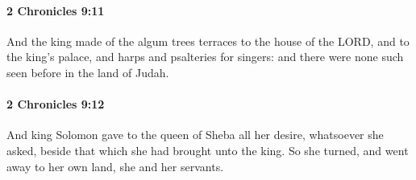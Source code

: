 		\paragraph{2 Chronicles 9:11} %
			\label{2CHRONICLES-9-11}

			And the king made of the algum trees terraces to the house of the LORD, and to the king's palace, and harps and psalteries for singers: and there were none such seen before in the land of Judah.


		\paragraph{2 Chronicles 9:12} %
			\label{2CHRONICLES-9-12}

			And king Solomon gave to the queen of Sheba all her desire, whatsoever she asked, beside that which she had brought unto the king. So she turned, and went away to her own land, she and her servants.

